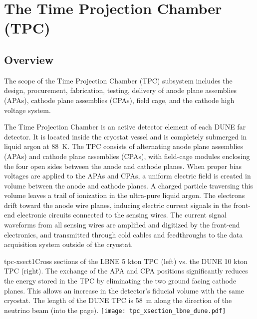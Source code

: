 
\section{The Time Projection Chamber (TPC)} 
\label{sec:detectors-fd-ref-tpc}

\subsection{Overview}

The scope of the Time Projection Chamber (TPC) subsystem includes the
design, procurement, fabrication, testing, delivery of anode plane
assemblies (APAs), cathode plane assemblies (CPAs), field cage, and
the cathode high voltage system.

The Time Projection Chamber is an active detector element of each DUNE
far detector. It is located inside the cryostat vessel and is
completely submerged in liquid argon at 88~K. The TPC consists of
alternating anode plane assemblies (APAs) and cathode plane assemblies
(CPAs), with field-cage modules enclosing the four open sides between
the anode and cathode planes.  When proper bias voltages are applied
to the APAs and CPAs, a uniform electric field is created in volume
between the anode and cathode planes. A charged particle traversing
this volume leaves a trail of ionization in the ultra-pure liquid
argon.  The electrons drift toward the anode wire planes, inducing
electric current signals in the front-end electronic circuits
connected to the sensing wires.  The current signal waveforms from all
sensing wires are amplified and digitized by the front-end
electronics, and transmitted through cold cables and feedthroughs to
the data acquisition system outside of the cryostat.


\begin{cdrfigure}{tpc-xsect1}{Cross sections of the LBNE 5 kton TPC (left) vs. the DUNE 10 kton TPC (right).  The exchange of the APA and CPA positions significantly reduces the energy stored in the TPC by eliminating the two ground facing cathode planes. This allows an increase in the detector's fiducial volume with the same cryostat.  The length of the DUNE TPC is  58~m along the direction of the neutrino beam (into the page).}
\texttt{[image: tpc\_xsection\_lbne\_dune.pdf]}
\end{cdrfigure}


